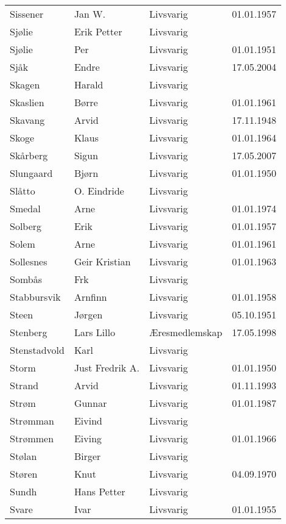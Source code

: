 \begin{longtable}{llll}
        Sissener	&	Jan W.	&	Livsvarig 	&	01.01.1957	\\
        Sjølie	&	Erik Petter	&	Livsvarig 	&		\\
        Sjølie	&	Per	&	Livsvarig 	&	01.01.1951	\\
        Sjåk 	&	Endre	&	Livsvarig	&	17.05.2004	\\
        Skagen	&	Harald	&	Livsvarig 	&		\\
        Skaslien	&	Børre	&	Livsvarig 	&	01.01.1961	\\
        Skavang	&	Arvid	&	Livsvarig 	&	17.11.1948	\\
        Skoge	&	Klaus	&	Livsvarig 	&	01.01.1964	\\
        Skårberg	&	Sigun	&	Livsvarig	&	17.05.2007	\\
        Slungaard	&	Bjørn	&	Livsvarig 	&	01.01.1950	\\
        Slåtto	&	O. Eindride	&	Livsvarig 	&		\\
        Smedal	&	Arne	&	Livsvarig 	&	01.01.1974	\\
        Solberg	&	Erik	&	Livsvarig 	&	01.01.1957	\\
        Solem	&	Arne	&	Livsvarig 	&	01.01.1961	\\
        Sollesnes	&	Geir Kristian	&	Livsvarig 	&	01.01.1963	\\
        Sombås	&	Frk	&	Livsvarig 	&		\\
        Stabbursvik	&	Arnfinn	&	Livsvarig 	&	01.01.1958	\\
        Steen	&	Jørgen	&	Livsvarig 	&	05.10.1951	\\
        Stenberg 	&	Lars Lillo 	&	Æresmedlemskap	&	17.05.1998	\\
        Stenstadvold	&	Karl	&	Livsvarig 	&		\\
        Storm	&	Just Fredrik A.	&	Livsvarig 	&	01.01.1950	\\
        Strand	&	Arvid	&	Livsvarig 	&	01.11.1993	\\
        Strøm	&	Gunnar	&	Livsvarig 	&	01.01.1987	\\
        Strømman	&	Eivind	&	Livsvarig 	&		\\
        Strømmen	&	Eiving	&	Livsvarig 	&	01.01.1966	\\
        Stølan	&	Birger	&	Livsvarig 	&		\\
        Støren	&	Knut	&	Livsvarig 	&	04.09.1970	\\
        Sundh	&	Hans Petter	&	Livsvarig 	&		\\
        Svare	&	Ivar	&	Livsvarig 	&	01.01.1955	\\

\end{longtable}
